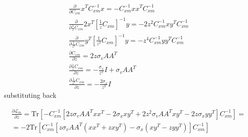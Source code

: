 \documentclass{paper}
\begin{document}
\begin{eqnarray}
\frac{\partial}{\partial C_{xm}} x^T C_{xm}^{-1} x = - C_{xm}^{-1} xx^T C_{xm}^{-1} \\
\frac{\partial}{\partial \frac{1}{z} C_{xm}}  2 x^T \left[ \frac{1}{z} C_{xm} \right]^{-1} y = -2z^2 C_{xm}^{-1} x y^T C_{xm}^{-1} \\
\frac{\partial}{\partial \frac{1}{z^2} C_{xm}}   y^T  \left[ \frac{1}{z^2} C_{xm} \right]^{-1} y = - z^4 C_{xm}^{-1} yy^T C_{xm}^{-1} \\
\frac{\partial C_{xm}}{\partial z} = 2z \sigma_v AA^T \\
 \frac{\partial \frac{1}{z} C_{xm}}{\partial z} =  - \frac{\sigma_x}{z^2} I + \sigma_v AA^T \\
 \frac{\partial \frac{1}{z^2} C_{xm}}{\partial z} = -\frac{2 \sigma_x}{z^3} I
\end{eqnarray}
%
substituting back

\begin{equation}
\begin{split}
\frac{\partial  \mathcal{L}_m}{\partial z}  = \mathrm{Tr} \left[   - C_{xm}^{-1} \left[ 2z \sigma_v AA^T xx^T  - 2 \sigma_x x y^T + 2z^2 \sigma_v AA^T x y^T - 2z \sigma_x yy^T \right] C_{xm}^{-1}  \right]  = \\
=  -2 \mathrm{Tr} \left[ C_{xm}^{-1} \left[ z \sigma_v AA^T (xx^T  + z x y^T) - \sigma_x (x y^T  - z yy^T) \right] C_{xm}^{-1}  \right]
\end{split}
\end{equation}
\end{document}
